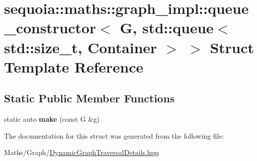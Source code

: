 \hypertarget{structsequoia_1_1maths_1_1graph__impl_1_1queue__constructor_3_01_g_00_01std_1_1queue_3_01std_1_1305d4c3c1dfd9b4d4ee62b4be50de092}{}\section{sequoia\+::maths\+::graph\+\_\+impl\+::queue\+\_\+constructor$<$ G, std\+::queue$<$ std\+::size\+\_\+t, Container $>$ $>$ Struct Template Reference}
\label{structsequoia_1_1maths_1_1graph__impl_1_1queue__constructor_3_01_g_00_01std_1_1queue_3_01std_1_1305d4c3c1dfd9b4d4ee62b4be50de092}
\subsection*{Static Public Member Functions}
\begin{DoxyCompactItemize}
\item 
\mbox{\label{structsequoia_1_1maths_1_1graph__impl_1_1queue__constructor_3_01_g_00_01std_1_1queue_3_01std_1_1305d4c3c1dfd9b4d4ee62b4be50de092_a220612da2ed1a426d7b9add1d28c32e4}} 
static auto {\bfseries make} (const G \&g)
\end{DoxyCompactItemize}


The documentation for this struct was generated from the following file\+:\begin{DoxyCompactItemize}
\item 
Maths/\+Graph/\mbox{\hyperlink{_dynamic_graph_traversal_details_8hpp}{Dynamic\+Graph\+Traversal\+Details.\+hpp}}\end{DoxyCompactItemize}
